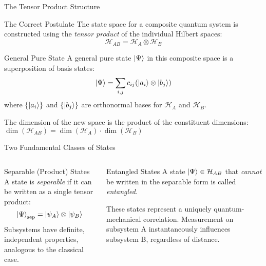 
\begin{frame}{The Tensor Product Structure}
  \begin{block}{The Correct Postulate}
    The state space for a composite quantum system is constructed using the
    \emph{tensor product} of the individual Hilbert spaces:
    \begin{equation}
      \mathcal{H}_{AB} = \mathcal{H}_A \otimes \mathcal{H}_B
    \end{equation}
  \end{block}
  \pause
  \vspace{-1em}
  \begin{block}{General Pure State}
    A general pure state $\ket{\Psi}$ in this composite space is a superposition of basis states:
    \begin{equation}
      \ket{\Psi} = \sum_{i,j} c_{ij} (\ket{a_i} \otimes \ket{b_j})
    \end{equation}
    where $\{\ket{a_i}\}$ and $\{\ket{b_j}\}$ are orthonormal bases for
    $\mathcal{H}_A$ and $\mathcal{H}_B$.
    \pause

    The dimension of the new space is the product of the constituent dimensions:
    \(
      \dim(\mathcal{H}_{AB}) = \dim(\mathcal{H}_A) \cdot \dim(\mathcal{H}_B)
    \)
  \end{block}
\end{frame}


\begin{frame}{Two Fundamental Classes of States}
  \begin{columns}[T]
    \begin{column}{0.5\textwidth}
      \begin{block}{Separable (Product) States}
        A state is \emph{separable} if it can be written as a single tensor product:
        \begin{equation}
          \ket{\Psi}_{\text{sep}} = \ket{\psi_A} \otimes \ket{\psi_B}
        \end{equation}
        Subsystems have definite, independent properties, analogous to the classical case.
      \end{block}
    \end{column}
    \pause
    \begin{column}{0.5\textwidth}
      \begin{alertblock}{Entangled States}
        A state $\ket{\Psi} \in \mathcal{H}_{AB}$ that \emph{cannot} be written
        in the separable form is called \emph{entangled}.

        These states represent a uniquely quantum-mechanical correlation.
        Measurement on subsystem A instantaneously influences subsystem B,
        regardless of distance.
      \end{alertblock}
    \end{column}
  \end{columns}
\end{frame}


